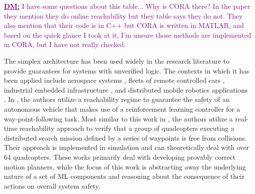 \documentclass[manuscript,screen,review]{acmart}
\newcommand{\diego}[1]{\textcolor{purple}{\textbf{\underline{DM:}} #1}}
\begin{document}
\diego{I have some questions about this table... Why is CORA there? In the paper they mention they do online reachability but they table says they do not. They also mention that their code is in C++ but CORA is written in MATLAB, and based on the quick glance I took at it, I'm unsure those methods are implemented in CORA, but I have not really checked.}


The simplex architecture has been used widely in the research literature to provide guarantees for systems with unverified logic. The contexts in which it has been applied include aerospace systems \cite{SetoCaseStudy2000}, fleets of remote controlled cars \cite{Crenshaw2007}, industrial embedded infrastructure \cite{Bak2009Simplex,Yang2017}, and distributed mobile robotics applications \cite{Desai2018,Tran2020}. In \cite{Lin2020}, the authors utilize a reachability regime to guarantee the safety of an autonomous vehicle that makes use of a reinforcement learning controller for a way-point-following task. Most similar to this work in \cite{Tran2020}, the authors utilize a real-time reachability approach to verify that a group of quadcopters executing a distributed search mission defined by a series of waypoints is free from collisions. Their approach is implemented in simulation and can theoretically deal with over 64 quadcopters. These works primarily deal with developing provably correct motion planners, while the focus of this work is abstracting away the underlying nature of a set of ML components and reasoning about the consequence of their actions on overall system safety.



\end{document}
